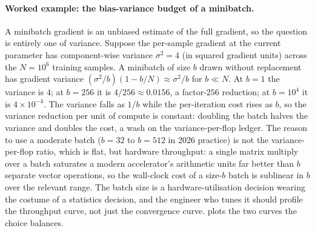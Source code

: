 \paragraph{Worked example: the bias-variance budget of a
minibatch.}
A minibatch gradient is an unbiased estimate of the full gradient,
so the question is entirely one of variance. Suppose the per-sample
gradient at the current parameter has component-wise variance
$\sigma^{2} = 4$ (in squared gradient units) across the $N = 10^{6}$
training samples. A minibatch of size $b$ drawn without replacement
has gradient variance $(\sigma^{2}/b)(1 - b/N) \approx \sigma^{2}/b$
for $b \ll N$. At $b = 1$ the variance is $4$; at $b = 256$ it is
$4/256 \approx 0.0156$, a factor-$256$ reduction; at $b = 10^{4}$
it is $4 \times 10^{-4}$. The variance falls as $1/b$ while the
per-iteration cost rises as $b$, so the variance reduction per unit
of compute is constant: doubling the batch halves the variance and
doubles the cost, a wash on the variance-per-flop ledger. The
reason to use a moderate batch ($b = 32$ to $b = 512$ in 2026
practice) is not the variance-per-flop ratio, which is flat, but
hardware throughput: a single matrix multiply over a batch
saturates a modern accelerator's arithmetic units far better than
$b$ separate vector operations, so the wall-clock cost of a
size-$b$ batch is sublinear in $b$ over the relevant range. The
batch size is a hardware-utilisation decision wearing the costume
of a statistics decision, and the engineer who tunes it should
profile the throughput curve, not just the convergence curve.
 plots the two curves the choice
balances.




